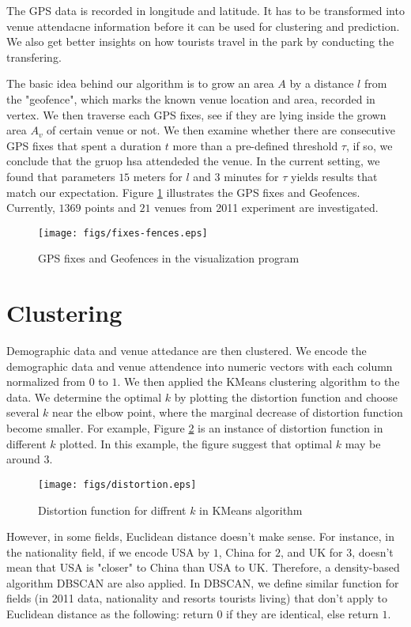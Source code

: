 \documentclass[12pt]{article}
\begin{document}
The GPS data is recorded in longitude and latitude. It has to be transformed into venue attendacne information before it can be used for clustering and prediction. We also get better insights on how tourists travel in the park by conducting the transfering.

The basic idea behind our algorithm is to grow an area $A$ by a distance $l$ from the "geofence", which marks the known venue location and area, recorded in vertex. We then traverse each GPS fixes, see if they are lying inside the grown area $A_v$ of certain venue or not. We then examine whether there are consecutive GPS fixes that spent a duration $t$ more than a pre-defined threshold $\tau$, if so, we conclude that the gruop hsa attendeded the venue. In the current setting, we found that parameters $15$ meters for $l$ and $3$ minutes for $\tau$ yields results that match our expectation. Figure \ref{fixes-fences} illustrates the GPS fixes and Geofences. Currently, $1369$ points and $21$ venues from 2011 experiment are investigated.  

\begin{figure}
\centering
    \texttt{[image: figs/fixes-fences.eps]}
\caption{GPS fixes and Geofences in the visualization program}
\label{fixes-fences}
\end{figure}

\section{Clustering}\label{clustering}
Demographic data and venue attedance are then clustered. We encode the demographic data and venue attendence into numeric vectors with each column normalized from $0$ to $1$. We then applied the KMeans clustering algorithm \cite{Lloyd82} to the data. We determine the optimal $k$ by plotting the distortion function and choose several $k$ near the elbow point, where the marginal decrease of distortion function become smaller. For example, Figure \ref{kmeans-k} is an instance of distortion function in different $k$ plotted. In this example, the figure suggest that optimal $k$ may be around $3$.

\begin{figure}
\centering
    \texttt{[image: figs/distortion.eps]}
\caption{Distortion function for diffrent $k$ in KMeans algorithm}
\label{kmeans-k}
\end{figure}

However, in some fields, Euclidean distance doesn't make sense. For instance, in the nationality field, if we encode USA by $1$, China for $2$, and UK for $3$, doesn't mean that USA is "closer" to China than USA to UK. Therefore, a density-based algorithm DBSCAN \cite{Ester96} are also applied. In DBSCAN, we define similar function for fields (in 2011 data, nationality and resorts tourists living) that don't apply to Euclidean distance as the following: return $0$ if they are identical, else return $1$.
\end{document}
